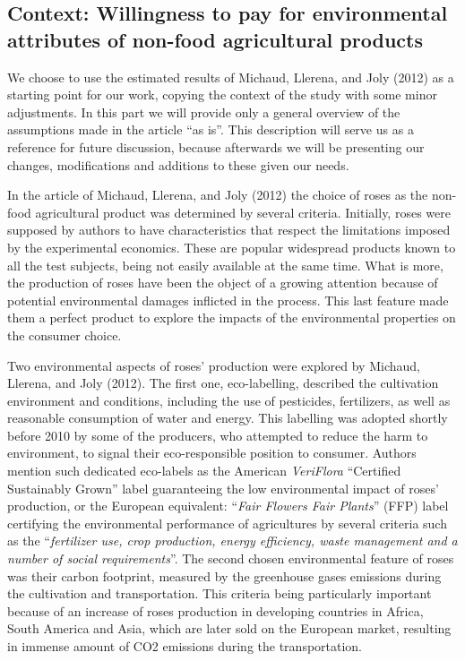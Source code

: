 \documentclass[11pt,]{article}
\begin{document}
\hypertarget{context-willingness-to-pay-for-environmental-attributes-of-non-food-agricultural-products}{%
\subsection{Context: Willingness to pay for environmental attributes of
non-food agricultural
products}\label{context-willingness-to-pay-for-environmental-attributes-of-non-food-agricultural-products}}

We choose to use the estimated results of Michaud, Llerena, and Joly
(2012) as a starting point for our work, copying the context of the
study with some minor adjustments. In this part we will provide only a
general overview of the assumptions made in the article ``as is''. This
description will serve us as a reference for future discussion, because
afterwards we will be presenting our changes, modifications and
additions to these given our needs.

In the article of Michaud, Llerena, and Joly (2012) the choice of roses
as the non-food agricultural product was determined by several criteria.
Initially, roses were supposed by authors to have characteristics that
respect the limitations imposed by the experimental economics. These are
popular widespread products known to all the test subjects, being not
easily available at the same time. What is more, the production of roses
have been the object of a growing attention because of potential
environmental damages inflicted in the process. This last feature made
them a perfect product to explore the impacts of the environmental
properties on the consumer choice.

Two environmental aspects of roses' production were explored by Michaud,
Llerena, and Joly (2012). The first one, eco-labelling, described the
cultivation environment and conditions, including the use of pesticides,
fertilizers, as well as reasonable consumption of water and energy. This
labelling was adopted shortly before 2010 by some of the producers, who
attempted to reduce the harm to environment, to signal their
eco-responsible position to consumer. Authors mention such dedicated
eco-labels as the American \emph{VeriFlora} ``Certified Sustainably
Grown'' label guaranteeing the low environmental impact of roses'
production, or the European equivalent: ``\emph{Fair Flowers Fair
Plants}'' (FFP) label certifying the environmental performance of
agricultures by several criteria such as the ``\emph{fertilizer use,
crop production, energy efficiency, waste management and a number of
social requirements}''. The second chosen environmental feature of roses
was their carbon footprint, measured by the greenhouse gases emissions
during the cultivation and transportation. This criteria being
particularly important because of an increase of roses production in
developing countries in Africa, South America and Asia, which are later
sold on the European market, resulting in immense amount of CO2
emissions during the transportation.
\end{document}
